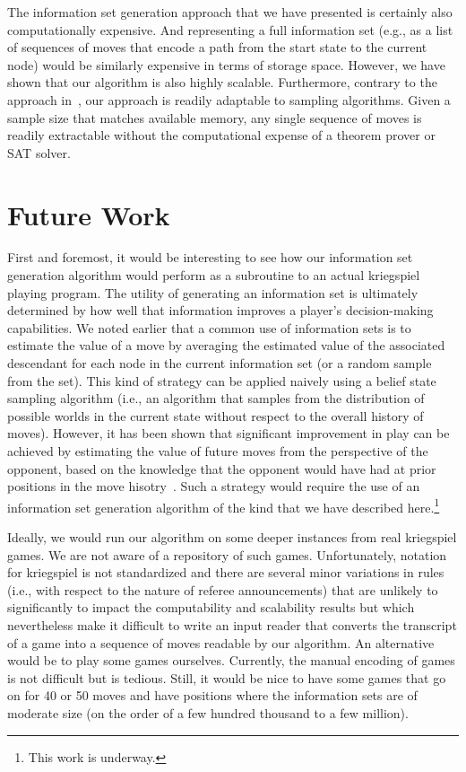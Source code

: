 \documentclass[conference]{IEEEtran}
\begin{document}
The information set generation approach that we have presented is certainly also computationally expensive.  And
representing a full information set (e.g., as a list of sequences of moves that encode a path from the start state to
the current node) would be similarly expensive in terms of storage space.  However, we have shown that our algorithm is
also highly scalable.  Furthermore, contrary to the approach in~\cite{nance06reasoning}, our approach is readily
adaptable to sampling algorithms.  Given a sample size that matches available memory, any single sequence of moves is
readily extractable without the computational expense of a theorem prover or SAT solver.

\section{Future Work}

First and foremost, it would be interesting to see how our information set generation algorithm would perform as a
subroutine to an actual kriegspiel playing program.  The utility of generating an information set is ultimately
determined by how well that information improves a player's decision-making capabilities.  We noted earlier that a
common use of information sets is to estimate the value of a move by averaging the estimated value of the associated
descendant for each node in the current information set (or a random sample from the set).  This kind of strategy can be
applied naively using a belief state sampling algorithm (i.e., an algorithm that samples from the distribution of
possible worlds in the current state without respect to the overall history of moves).  However, it has been shown that
significant improvement in play can be achieved by estimating the value of future moves from the perspective of the
opponent, based on the knowledge that the opponent would have had at prior positions in the move
hisotry~\cite{richards07opponent}.  Such a strategy would require the use of an information set generation algorithm of the
kind that we have described here.\footnote{This work is underway.}

Ideally, we would run our algorithm on some deeper instances from real kriegspiel games.  We are not aware of a
repository of such games.  Unfortunately, notation for kriegspiel is not standardized and there are several minor
variations in rules (i.e., with respect to the nature of referee announcements) that are unlikely to significantly to
impact the computability and scalability results but which nevertheless make it difficult to write an input reader that
converts the transcript of a game into a sequence of moves readable by our algorithm.  An alternative would be to play
some games ourselves.  Currently, the manual encoding of games is not difficult but is tedious.  Still, it would be nice
to have some games that go on for 40 or 50 moves and have positions where the information sets are of moderate size (on
the order of a few hundred thousand to a few million).
\end{document}
